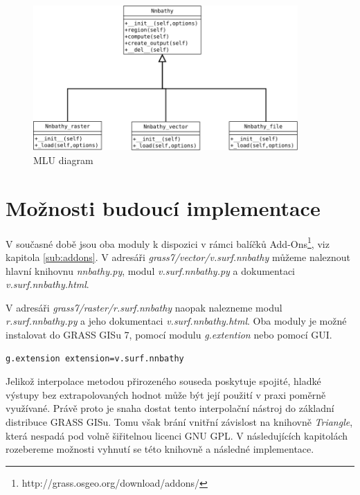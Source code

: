\documentclass[12pt,a4paper]{article}
\begin{document}
\newpage
\begin{figure}[h!]
\centering
\includegraphics[width=0.9\textwidth]{img/mlu.png}
\caption{MLU diagram}
\label{fig:vystup_rast_map}
\end{figure}

\newpage
\section{Možnosti budoucí implementace}
V současné době jsou oba moduly k dispozici v rámci balíčků
Add-Ons\footnote{http://grass.osgeo.org/download/addons/}, viz kapitola \ref{sub:addons}. V adresáři
\emph{grass7/vector/v.surf.nnbathy} můžeme naleznout hlavní knihovnu
\emph{nnbathy.py}, modul \emph{v.surf.nnbathy.py} a dokumentaci
\emph{v.surf.nnbathy.html}.

V adresáři \emph{grass7/raster/r.surf.nnbathy} naopak nalezneme modul
\emph{r.surf.nnbathy.py} a jeho dokumentaci
\emph{v.surf.nnbathy.html}. Oba moduly je možné instalovat do GRASS
GISu 7, pomocí modulu \emph{g.extention} nebo pomocí GUI.

\bigskip
\begin{lstlisting}[caption={Stáhnutí modulu v.surf.nnbathy pomocí g.extention}]
g.extension extension=v.surf.nnbathy
\end{lstlisting}

\bigskip 

Jelikož interpolace metodou přirozeného souseda poskytuje
spojité, hladké výstupy bez extrapolovaných hodnot může být její
použití v praxi poměrně využívané. Právě proto je snaha dostat tento
interpolační nástroj do základní distribuce GRASS GISu. Tomu však
brání vnitřní závislost na knihovně \emph{Triangle}, která nespadá pod volně
šiřitelnou licenci GNU GPL. V následujících kapitolách rozebereme
možnosti vyhnutí se této knihovně a následné implementace.
\end{document}
